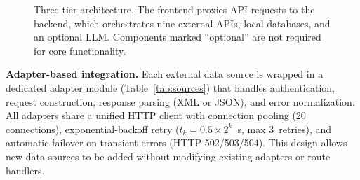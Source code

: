 \documentclass[preprint,12pt]{elsarticle}
\begin{document}
\begin{figure}[H]
\centering
{}
\caption{Three-tier architecture. The frontend proxies API requests to the backend, which orchestrates nine external APIs, local databases, and an optional LLM. Components marked ``optional'' are not required for core functionality.}
\label{fig:architecture}
\end{figure}

\textbf{Adapter-based integration.}
Each external data source is wrapped in a dedicated adapter module (Table~\ref{tab:sources}) that handles authentication, request construction, response parsing (XML or JSON), and error normalization.
All adapters share a unified HTTP client with connection pooling (20 connections), exponential-backoff retry ($t_k = 0.5 \times 2^k$~s, max 3~retries), and automatic failover on transient errors (HTTP 502/503/504).
This design allows new data sources to be added without modifying existing adapters or route handlers.
\end{document}

